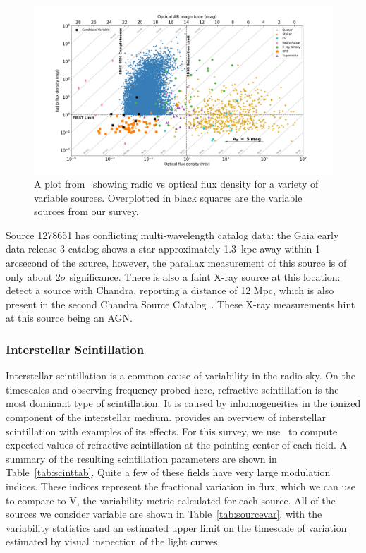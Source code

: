 \documentclass[12pt]{article}
\begin{document}
\begin{figure}
	\includegraphics[width=\textwidth]{myradoptvars.png}
	\caption{A plot from~\citet{2018MNRAS.479.2481S} showing radio vs optical flux density for a variety of variable sources. Overplotted in black squares are the variable sources from our survey.}
	\label{fig:radoptplot}
\end{figure}

Source 1278651 has conflicting multi-wavelength catalog data: the Gaia early data release 3 catalog \citep{2021AJ....161..147B} shows a star approximately 1.3~kpc away within 1 arcsecond of the source, however, the parallax measurement of this source is of only about 2$\sigma$ significance. There is also a faint X-ray source at this location: \citet{2011ApJS..192...10L} detect a source with Chandra, reporting a distance of 12 Mpc, which is also present in the second Chandra Source Catalog~\citep{2010ApJS..189...37E}. These X-ray measurements hint at this source being an AGN.


\subsubsection{Interstellar Scintillation}

Interstellar scintillation is a common cause of variability in the radio sky. On the timescales and observing frequency probed here, refractive scintillation is the most dominant type of scintillation. It is caused by inhomogeneities in the ionized component of the interstellar medium. \citet{1998MNRAS.294..307W} provides an overview of interstellar scintillation with examples of its effects. For this survey, we use~\citet{2019arXiv190708395H} to compute expected values of refractive scintillation at the pointing center of each field. A summary of the resulting scintillation parameters are shown in Table~\ref{tab:scinttab}. Quite a few of these fields have very large modulation indices. These indices represent the fractional variation in flux, which we can use to compare to V, the variability metric calculated for each source. All of the sources we consider variable are shown in Table~\ref{tab:sourcevar}, with the variability statistics and an estimated upper limit on the timescale of variation estimated by visual inspection of the light curves. 
\end{document}
